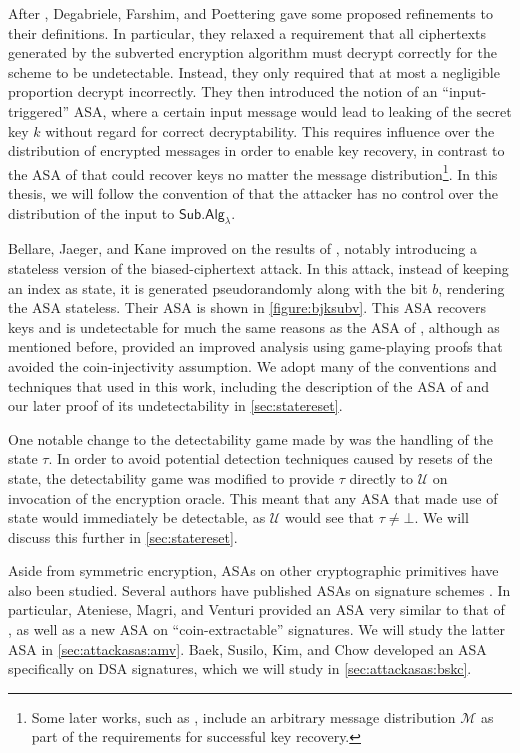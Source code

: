 After \cite{C:BelPatRog14}, Degabriele, Farshim, and Poettering \cite{FSE:DegFarPoe15} gave some proposed refinements to their definitions. In particular, they relaxed a requirement that all ciphertexts generated by the subverted encryption algorithm must decrypt correctly for the scheme to be undetectable. Instead, they only required that at most a negligible proportion decrypt incorrectly. They then introduced the notion of an ``input-triggered'' ASA, where a certain input message would lead to leaking of the secret key $k$ without regard for correct decryptability. This requires influence over the distribution of encrypted messages in order to enable key recovery, in contrast to the ASA of \cite{C:BelPatRog14} that could recover keys no matter the message distribution\footnote{Some later works, such as \cite{CCS:BelJaeKan15}, include an arbitrary message distribution $\mathcal{M}$ as part of the requirements for successful key recovery.}. In this thesis, we will follow the convention of \cite{C:BelPatRog14} that the attacker has no control over the distribution of the input to $\mathsf{Sub.Alg}_\lambda$.

Bellare, Jaeger, and Kane \cite{CCS:BelJaeKan15} improved on the results of \cite{C:BelPatRog14}, notably introducing a stateless version of the biased-ciphertext attack. In this attack, instead of keeping an index as state, it is generated pseudorandomly along with the bit $b$, rendering the ASA stateless. Their ASA is shown in \autoref{figure:bjksubv}. This ASA recovers keys and is undetectable for much the same reasons as the ASA of \cite{C:BelPatRog14}, although as mentioned before, \cite{CCS:BelJaeKan15} provided an improved analysis using game-playing proofs that avoided the coin-injectivity assumption. We adopt many of the conventions and techniques that \cite{CCS:BelJaeKan15} used in this work, including the description of the ASA of \cite{C:BelPatRog14} and our later proof of its undetectability in \autoref{sec:statereset}.

One notable change to the detectability game made by \cite{CCS:BelJaeKan15} was the handling of the state $\tau$. In order to avoid potential detection techniques caused by resets of the state, the detectability game was modified to provide $\tau$ directly to $\mathcal{U}$ on invocation of the encryption oracle. This meant that any ASA that made use of state would immediately be detectable, as $\mathcal{U}$ would see that $\tau \neq \bot$. We will discuss this further in \autoref{sec:statereset}.

Aside from symmetric encryption, ASAs on other cryptographic primitives have also been studied. Several authors have published ASAs on signature schemes \cite{CCS:AteMagVen15,BSKC2019,ACISP:LCWW18}. In particular, Ateniese, Magri, and Venturi \cite{CCS:AteMagVen15} provided an ASA very similar to that of \cite{CCS:BelJaeKan15}, as well as a new ASA on ``coin-extractable'' signatures. We will study the latter ASA in \ref{sec:attackasas:amv}. Baek, Susilo, Kim, and Chow \cite{BSKC2019} developed an ASA specifically on DSA signatures, which we will study in \autoref{sec:attackasas:bskc}.

